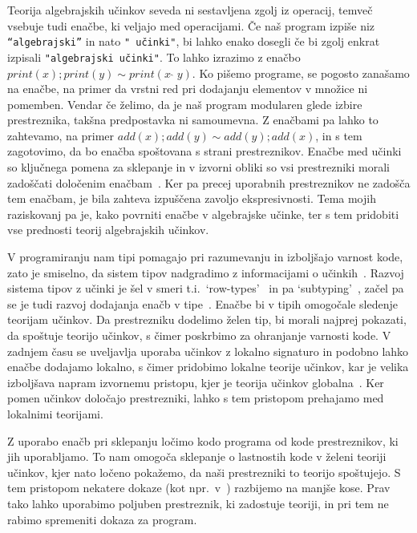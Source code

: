 \documentclass{article}
\begin{document}
Teorija algebrajskih učinkov seveda ni sestavljena zgolj iz operacij, temveč vsebuje tudi enačbe, ki veljajo med operacijami. Če naš program izpiše niz \texttt{``algebrajski''} in nato \texttt{" učinki"}, bi lahko enako dosegli če bi zgolj enkrat izpisali \texttt{"algebrajski učinki"}. To lahko izrazimo z enačbo $print(x); print(y) \sim print(x\;\hat{}\;y)$. Ko pišemo programe, se pogosto zanašamo na enačbe, na primer da vrstni red pri dodajanju elementov v množice ni pomemben. Vendar če želimo, da je naš program modularen glede izbire prestreznika, takšna predpostavka ni samoumevna. Z enačbami pa lahko to zahtevamo, na primer $add(x); add(y) \sim add(y); add(x)$, in s tem zagotovimo, da bo enačba spoštovana s strani prestreznikov. Enačbe med učinki so ključnega pomena za sklepanje in v izvorni obliki so vsi prestrezniki morali zadoščati določenim enačbam~\cite{DBLP:conf/esop/PlotkinP09}. Ker pa precej uporabnih prestreznikov ne zadošča tem enačbam, je bila zahteva izpuščena zavoljo ekspresivnosti. Tema mojih raziskovanj pa je, kako povrniti enačbe v algebrajske učinke, ter s tem pridobiti vse prednosti teorij algebrajskih učinkov.

V programiranju nam tipi pomagajo pri razumevanju in izboljšajo varnost kode, zato je smiselno, da sistem tipov nadgradimo z informacijami o učinkih~\cite{DBLP:conf/esop/PlotkinP09}. Razvoj sistema tipov z učinki je šel v smeri t.i.\ `row-types'~\cite{DBLP:conf/icfp/HillerstromL16} in pa `subtyping'~\cite{DBLP:conf/esop/SalehKPS18}, začel pa se je tudi razvoj dodajanja enačb v tipe~\cite{DBLP:journals/pacmpl/Ahman18}. Enačbe bi v tipih omogočale sledenje teorijam učinkov. Da prestrezniku dodelimo želen tip, bi morali najprej pokazati, da spoštuje teorijo učinkov, s čimer poskrbimo za ohranjanje varnosti kode. V zadnjem času se uveljavlja uporaba učinkov z lokalno signaturo in podobno lahko enačbe dodajamo lokalno, s čimer pridobimo lokalne teorije učinkov, kar je velika izboljšava napram izvornemu pristopu, kjer je teorija učinkov globalna~\cite{DBLP:conf/esop/PlotkinP09}. Ker pomen učinkov določajo prestrezniki, lahko s tem pristopom prehajamo med lokalnimi teorijami.

Z uporabo enačb pri sklepanju ločimo kodo programa od kode prestreznikov, ki jih uporabljamo. To nam omogoča sklepanje o lastnostih kode v želeni teoriji učinkov, kjer nato ločeno pokažemo, da naši prestrezniki to teorijo spoštujejo. S tem pristopom nekatere dokaze (kot npr.\ v~\cite{DBLP:journals/jlp/BauerP15}) razbijemo na manjše kose. Prav tako lahko uporabimo poljuben prestreznik, ki zadostuje teoriji, in pri tem ne rabimo spremeniti dokaza za program.
\end{document}
